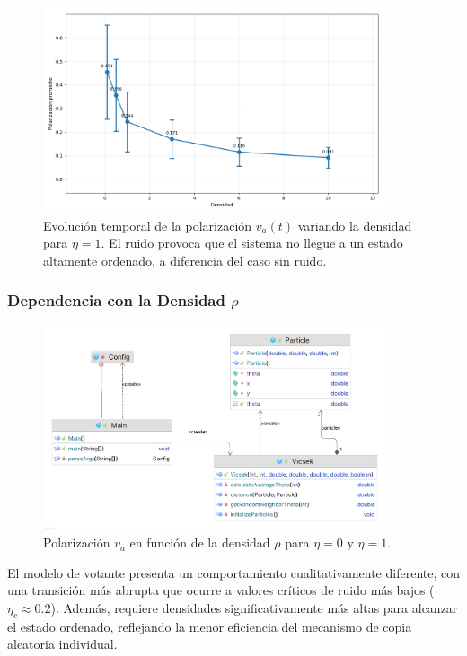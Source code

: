 \documentclass{article}
\begin{document}
\begin{figure}[H]
\centering
\includegraphics[width=0.9\textwidth]{Voter Ruido 1 variando densidad avg.png}
\caption{Evolución temporal de la polarización $v_a(t)$ variando la densidad para $\eta = 1$. El ruido provoca que el sistema no llegue a un estado altamente ordenado, a diferencia del caso sin ruido.}
\label{fig:va_tiempo_densidad_voter1}
\end{figure}


\subsubsection{Dependencia con la Densidad $\rho$}
\begin{figure}[H]
\centering
\includegraphics[width=0.9\textwidth]{TP2_UML.png}
\caption{Polarización $v_a$ en función de la densidad $\rho$ para $\eta = 0$ y $\eta = 1$.}
\label{fig:va_vs_rho_voter}
\end{figure}

El modelo de votante presenta un comportamiento cualitativamente diferente, con una transición más abrupta que ocurre a valores críticos de ruido más bajos ($\eta_c \approx 0.2$). Además, requiere densidades significativamente más altas para alcanzar el estado ordenado, reflejando la menor eficiencia del mecanismo de copia aleatoria individual.
\end{document}
